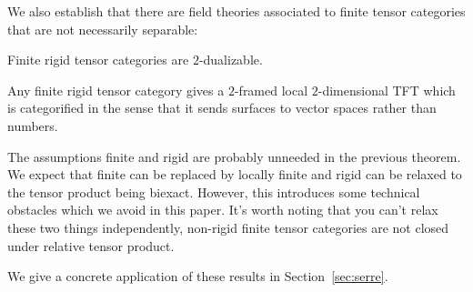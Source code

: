 \documentclass{amsart}
\begin{document}

We also establish that there are field theories associated to finite tensor categories that are not necessarily separable:

\begin{maintheorem}
Finite rigid tensor categories are $2$-dualizable.
\end{maintheorem}

\begin{maincor}
Any finite rigid tensor category gives a $2$-framed local $2$-dimensional TFT which is categorified in the sense that it sends surfaces to vector spaces rather than numbers.
\end{maincor}

\begin{remark}
The assumptions finite and rigid are probably unneeded in the previous theorem.  We expect that finite can be replaced by locally finite and rigid can be relaxed to the tensor product being biexact.  However, this introduces some technical obstacles which we avoid in this paper.  It's worth noting that you can't relax these two things independently, non-rigid finite tensor categories are not closed under relative tensor product.
\end{remark}

We give a concrete application of these results in  Section~\ref{sec:serre}.

\end{document}
